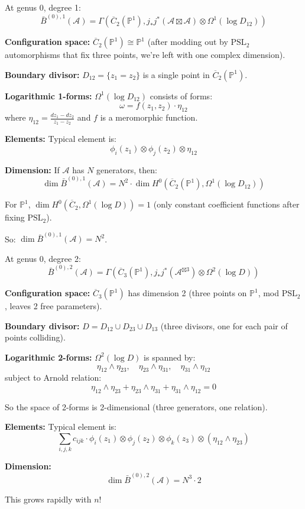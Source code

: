 \begin{example}\label{ex:bar-genus0-deg1}
At genus 0, degree 1:
$$\bar{B}^{(0),1}(\mathcal{A}) = \Gamma\left(\overline{C}_2(\mathbb{P}^1), j_*j^*(\mathcal{A} \boxtimes \mathcal{A}) \otimes \Omega^1(\log D_{12})\right)$$

\textbf{Configuration space:} $\overline{C}_2(\mathbb{P}^1) \cong \mathbb{P}^1$ (after modding out by $\text{PSL}_2$ automorphisms that fix three points, we're left with one complex dimension).

\textbf{Boundary divisor:} $D_{12} = \{z_1 = z_2\}$ is a single point in $\overline{C}_2(\mathbb{P}^1)$.

\textbf{Logarithmic 1-forms:} $\Omega^1(\log D_{12})$ consists of forms:
$$\omega = f(z_1, z_2) \cdot \eta_{12}$$
where $\eta_{12} = \frac{dz_1 - dz_2}{z_1 - z_2}$ and $f$ is a meromorphic function.

\textbf{Elements:} Typical element is:
$$\phi_i(z_1) \otimes \phi_j(z_2) \otimes \eta_{12}$$

\textbf{Dimension:} If $\mathcal{A}$ has $N$ generators, then:
$$\dim \bar{B}^{(0),1}(\mathcal{A}) = N^2 \cdot \dim H^0(\overline{C}_2(\mathbb{P}^1), \Omega^1(\log D_{12}))$$

For $\mathbb{P}^1$, $\dim H^0(\overline{C}_2, \Omega^1(\log D)) = 1$ (only constant coefficient functions after fixing $\text{PSL}_2$).

So: $\dim \bar{B}^{(0),1}(\mathcal{A}) = N^2$.
\end{example}

\begin{example}\label{ex:bar-genus0-deg2}
At genus 0, degree 2:
$$\bar{B}^{(0),2}(\mathcal{A}) = \Gamma\left(\overline{C}_3(\mathbb{P}^1), j_*j^*(\mathcal{A}^{\boxtimes 3}) \otimes \Omega^2(\log D)\right)$$

\textbf{Configuration space:} $\overline{C}_3(\mathbb{P}^1)$ has dimension 2 (three points on $\mathbb{P}^1$, mod $\text{PSL}_2$, leaves 2 free parameters).

\textbf{Boundary divisor:} $D = D_{12} \cup D_{23} \cup D_{13}$ (three divisors, one for each pair of points colliding).

\textbf{Logarithmic 2-forms:} $\Omega^2(\log D)$ is spanned by:
$$\eta_{12} \wedge \eta_{23}, \quad \eta_{23} \wedge \eta_{31}, \quad \eta_{31} \wedge \eta_{12}$$
subject to Arnold relation:
$$\eta_{12} \wedge \eta_{23} + \eta_{23} \wedge \eta_{31} + \eta_{31} \wedge \eta_{12} = 0$$

So the space of 2-forms is 2-dimensional (three generators, one relation).

\textbf{Elements:} Typical element is:
$$\sum_{i,j,k} c_{ijk} \cdot \phi_i(z_1) \otimes \phi_j(z_2) \otimes \phi_k(z_3) \otimes (\eta_{12} \wedge \eta_{23})$$

\textbf{Dimension:} 
$$\dim \bar{B}^{(0),2}(\mathcal{A}) = N^3 \cdot 2$$

This grows rapidly with $n$!
\end{example}


